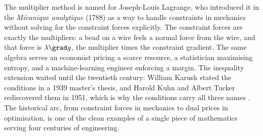 \begin{mastery}
The multiplier method is named for Joseph-Louis Lagrange, who
introduced it in the \textit{M\'ecanique analytique} (1788) as a way
to handle constraints in mechanics without solving for the
constraint forces explicitly. The constraint forces are exactly the
multipliers: a bead on a wire feels a normal force from the wire,
and that force is $\lambda\grad g$, the multiplier times the
constraint gradient. The same algebra serves an economist pricing a
scarce resource, a statistician maximising entropy, and a
machine-learning engineer enforcing a margin. The inequality
extension waited until the twentieth century: William Karush stated
the conditions in a 1939 master's thesis, and Harold Kuhn and Albert
Tucker rediscovered them in 1951, which is why the conditions carry
all three names \cite{text:v2ch11-nocedal-wright-2006}. The
historical arc, from constraint forces in mechanics to dual prices
in optimisation, is one of the clean examples of a single piece of
mathematics serving four centuries of engineering.
\end{mastery}

